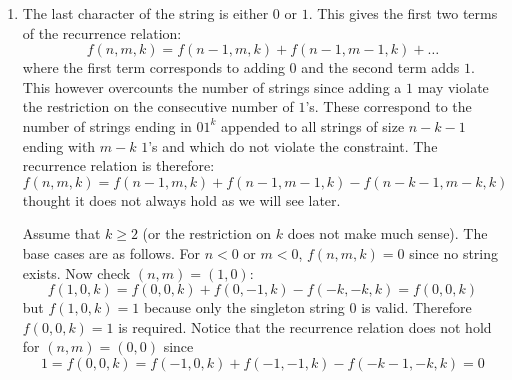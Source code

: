 \begin{solution}
    \begin{enumerate}[label=(\alph*)]
        \item The last character of the string is either $0$ or $1$. This gives the first two terms of the recurrence relation:
        \[
            f(n,m,k) = f(n-1,m,k) + f(n-1,m-1,k) + \ldots
        \]
        where the first term corresponds to adding $0$ and the second term adds $1$. This however overcounts the number of strings since adding a $1$ may violate the restriction on the consecutive number of $1$'s. These correspond to the number of strings ending in $01^k$ appended to all strings of size $n-k-1$ ending with $m-k$ $1$'s and which do not violate the constraint. The recurrence relation is therefore:
        \[
            f(n,m,k) = f(n-1,m,k) + f(n-1,m-1,k) - f(n-k-1,m-k,k)
        \]
        thought it does not always hold as we will see later.

        Assume that $k \geq 2$ (or the restriction on $k$ does not make much sense). The base cases are as follows. For $n<0$ or $m<0$, $f(n,m,k) = 0$ since no string exists. Now check $(n,m) = (1,0)$:
        \[
            f(1,0,k) = f(0,0,k) + f(0,-1,k) - f(-k,-k,k) = f(0,0,k)
        \]
        but $f(1,0,k) = 1$ because only the singleton string $0$ is valid. Therefore $f(0,0,k) = 1$ is required. Notice that the recurrence relation does not hold for $(n,m) = (0,0)$ since 
        \[
            1 = f(0,0,k) = f(-1,0,k) + f(-1,-1,k) - f(-k-1,-k,k) = 0
        \]


\end{enumerate}
\end{solution}
